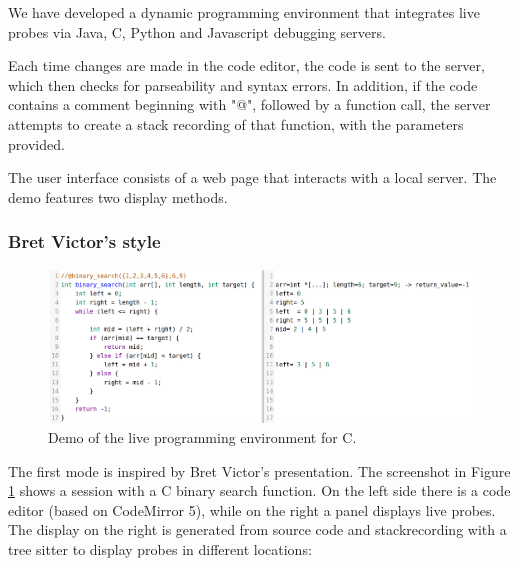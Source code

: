 \documentclass[english,submission]{programming}
\begin{document}
We have developed a dynamic programming environment that integrates live probes via Java, C, Python and Javascript debugging servers. 

Each time changes are made in the code editor, the code is sent to the server, which then checks for parseability and syntax errors.
In addition, if the code contains a comment beginning with "@", followed by a function call, the server attempts to create a stack recording of that function, with the parameters provided. 

The user interface consists of a web page that interacts with a local server. The demo features two display methods. 

\subsubsection{Bret Victor's style}
\label{sec:bret-victor-style}
\begin{figure}[htbp]
  \centering
  \includegraphics[width=\linewidth]{img/demo/c.png}
  \caption{Demo of the live programming environment for C.}
  \label{fig:demo}
\end{figure}

The first mode is inspired by Bret Victor's presentation. The screenshot in Figure \ref{fig:demo} shows a session with a C binary search function. 
On the left side there is a code editor (based on CodeMirror 5), while on the right a panel displays live probes. 
The display on the right is generated from source code and stackrecording with a tree sitter to display probes in different locations: 
\end{document}
